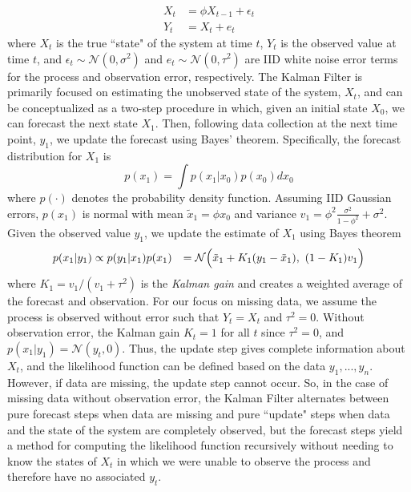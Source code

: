 \documentclass{article}
\begin{document}
\begin{equation*}
    \begin{aligned}
        X_t &= \phi X_{t-1} + \epsilon_t \\Y_t &= X_t + e_t
    \end{aligned}
\end{equation*}
where $X_t$ is the true ``state" of the system at time $t$, $Y_t$ is the observed value at time $t$, and $\epsilon_t \sim \mathcal{N}(0, \sigma^2)$ and $e_t \sim \mathcal{N}(0, \tau^2)$ are IID white noise error terms for the process and observation error, respectively. The Kalman Filter is primarily focused on estimating the unobserved state of the system, $X_t$, and can be conceptualized as a two-step procedure in which, given an initial state $X_0$, we can forecast the next state $X_1$. Then, following data collection at the next time point, $y_1$, we update the forecast using Bayes' theorem. Specifically, the forecast distribution for $X_1$ is
\begin{equation*}
    p(x_1) = \int p(x_1 | x_0)p(x_0)dx_0
\end{equation*}
where $p(\cdot)$ denotes the probability density function. Assuming IID Gaussian errors, $p(x_1)$ is normal with mean ${\tilde x}_1 = \phi x_0$ and variance $v_1 = \phi^2 \frac{\sigma^2}{1 - \phi^2} + \sigma^2$. Given the observed value $y_1$, we update the estimate of $X_1$ using Bayes theorem
\begin{equation*}
    \begin{aligned}
        p(x_1 | y_1) &\propto p(y_1 | x_1) p(x_1)
        &= \mathcal{N}\Bigl(\tilde x_1 + K_1(y_1 - \tilde x_1),\ (1 - K_1)v_1 \Bigr)
    \end{aligned} 
\end{equation*}
where $K_1 = v_1 / (v_1 + \tau^2)$ is the \textit{Kalman gain} and creates a weighted average of the forecast and observation. %
For our focus on missing data, we assume the process is observed without error such that $Y_t = X_t$ and $\tau^2 = 0$. Without observation error, the Kalman gain $K_t = 1$ for all $t$ since $\tau^2 = 0$, and $p(x_1 | y_1) = \mathcal{N}(y_t, 0)$. Thus, the update step gives complete information about $X_t$, and the likelihood function can be defined based on the data $y_1,...,y_n$. However, if data are missing, the update step cannot occur. So, in the case of missing data without observation error, the Kalman Filter alternates between pure forecast steps when data are missing and pure ``update" steps when data and the state of the system are completely observed, but the forecast steps yield a method for computing the likelihood function recursively without needing to know the states of $X_t$ in which we were unable to observe the process and therefore have no associated $y_t$.
\end{document}
